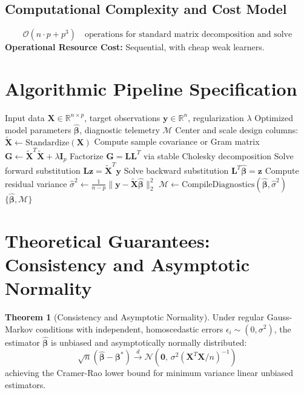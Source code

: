 \documentclass[11pt,a4paper]{article}
\theoremstyle{definition}
\newtheorem{theorem}{\textbf{Theorem}}[section]
\begin{document}
\subsection{Computational Complexity and Cost Model}
\begin{equation}
\mathcal{O}(n \cdot p + p^3) \quad \text{operations for standard matrix decomposition and solve}
\end{equation}
\textbf{Operational Resource Cost:} Sequential, with cheap weak learners.

\section{Algorithmic Pipeline Specification}

\begin{algorithm}[H]
\caption{AdaBoost Execution}
\begin{algorithmic}[1]
\Require Input data $\mathbf{X} \in \mathbb{R}^{n \times p}$, target observations $\mathbf{y} \in \mathbb{R}^n$, regularization $\lambda$
\Ensure Optimized model parameters $\hat{\boldsymbol{\beta}}$, diagnostic telemetry $\mathcal{M}$
\State Center and scale design columns: $\tilde{\mathbf{X}} \gets \text{Standardize}(\mathbf{X})$
\State Compute sample covariance or Gram matrix $\mathbf{G} \gets \tilde{\mathbf{X}}^T \tilde{\mathbf{X}} + \lambda \mathbf{I}_p$
\State Factorize $\mathbf{G} = \mathbf{L} \mathbf{L}^T$ via stable Cholesky decomposition
\State Solve forward substitution $\mathbf{L} \mathbf{z} = \tilde{\mathbf{X}}^T \mathbf{y}$
\State Solve backward substitution $\mathbf{L}^T \hat{\boldsymbol{\beta}} = \mathbf{z}$
\State Compute residual variance $\hat{\sigma}^2 \gets \frac{1}{n - p} \| \mathbf{y} - \tilde{\mathbf{X}} \hat{\boldsymbol{\beta}} \|_2^2$
\State $\mathcal{M} \gets \text{CompileDiagnostics}(\hat{\boldsymbol{\beta}}, \hat{\sigma}^2)$
\State \Return $\{\hat{\boldsymbol{\beta}}, \mathcal{M}\}$
\end{algorithmic}
\end{algorithm}

\section{Theoretical Guarantees: Consistency and Asymptotic Normality}

\begin{theorem}[Consistency and Asymptotic Normality]
Under regular Gauss-Markov conditions with independent, homoscedastic errors $\epsilon_i \sim (0, \sigma^2)$, the estimator $\hat{\boldsymbol{\beta}}$ is unbiased and asymptotically normally distributed:
\begin{equation}
\sqrt{n}(\hat{\boldsymbol{\beta}} - \boldsymbol{\beta}^*) \xrightarrow{d} \mathcal{N}\left(\mathbf{0}, \, \sigma^2 (\mathbf{X}^T \mathbf{X} / n)^{-1}\right)
\end{equation}
achieving the Cramer-Rao lower bound for minimum variance linear unbiased estimators.
\end{theorem}
\end{document}

